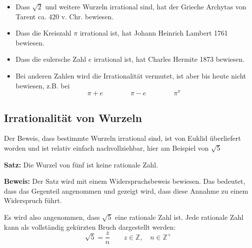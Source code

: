 \begin{itemize}
  \item Dass $\sqrt{2}$ und weitere Wurzeln irrational sind, hat der Grieche Archytas von Tarent ca. 420 v. Chr. bewiesen.
  \item Dass die Kreiszahl $\pi$ irrational ist, hat Johann Heinrich Lambert 1761 bewiesen.
  \item Dass die eulersche Zahl $e$ irrational ist, hat Charles Hermite 1873 bewiesen.
  \item Bei anderen Zahlen wird die Irrationalität vermutet, ist aber bis heute nicht bewiesen, z.B. bei
  \[
    \pi + e \qquad\qquad \pi - e \qquad\qquad \pi^{\pi}
  \]
\end{itemize}

\newpage
\subsection{Irrationalität von Wurzeln}

Der Beweis, dass bestimmte Wurzeln irrational sind, ist von Euklid überliefert worden und ist relativ einfach nachvollziehbar, hier am Beispiel von $\sqrt{5}$

\begin{theorem}
  \textbf{Satz:} Die Wurzel von fünf ist keine rationale Zahl.
\end{theorem}

\textbf{Beweis:} Der Satz wird mit einem Widerspruchsbeweis bewiesen. Das bedeutet, dass das Gegenteil angenommen und gezeigt wird, dass diese Annahme zu einem Widerspruch führt.

Es wird also angenommen, dass $\sqrt{5}$ eine rationale Zahl ist. Jede rationale Zahl kann als vollständig gekürzten Bruch dargestellt werden:
\[
  \sqrt{5} = \frac{z}{n} \qquad z \in \mathbb{Z}, \quad n \in \mathbb{Z^{+}}
\]

